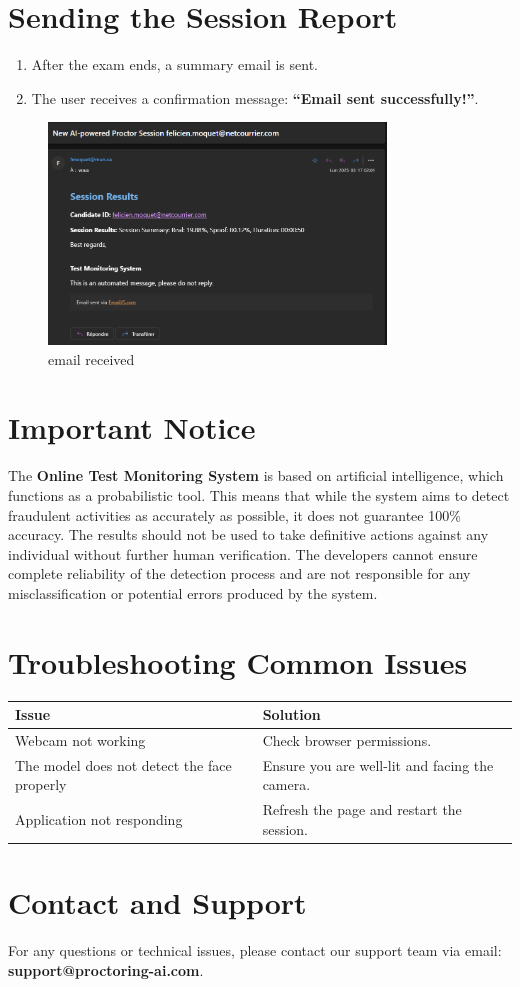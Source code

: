 \documentclass[a4paper,12pt]{article}
\begin{document}
\section{Sending the Session Report}
\begin{enumerate}
    \item After the exam ends, a summary email is sent.
    \item The user receives a confirmation message: \textbf{``Email sent successfully!''}.
\end{enumerate}

\begin{figure}[h!]
    \centering
    \includegraphics[width=0.8\textwidth]{IMG/email.png}
    \caption{email received}
    \label{fig:welcome_screen}
\end{figure}

\section{Important Notice}
The \textbf{Online Test Monitoring System} is based on artificial intelligence, which functions as a probabilistic tool. This means that while the system aims to detect fraudulent activities as accurately as possible, it does not guarantee 100\% accuracy. The results should not be used to take definitive actions against any individual without further human verification. The developers cannot ensure complete reliability of the detection process and are not responsible for any misclassification or potential errors produced by the system.

\section{Troubleshooting Common Issues}
\begin{tabular}{|p{6cm}|p{8cm}|}
    \hline
    \textbf{Issue} & \textbf{Solution} \\
    \hline
    Webcam not working & Check browser permissions. \\
    \hline
    The model does not detect the face properly & Ensure you are well-lit and facing the camera. \\
    \hline
    Application not responding & Refresh the page and restart the session. \\
    \hline
\end{tabular}

\section{Contact and Support}
For any questions or technical issues, please contact our support team via email: \textbf{support@proctoring-ai.com}.
\end{document}
